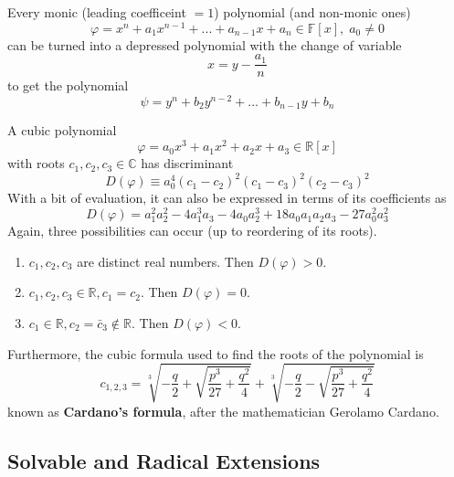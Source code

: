   \begin{theorem}
    Every monic (leading coefficeint $=1$) polynomial (and non-monic ones) 
    \begin{equation}
      \varphi = x^n + a_1 x^{n-1} + ... + a_{n-1} x + a_n \in \mathbb{F}[x], \; a_0 \neq 0
    \end{equation}
    can be turned into a depressed polynomial with the change of variable
    \begin{equation}
      x = y - \frac{a_1}{n}
    \end{equation}
    to get the polynomial 
    \begin{equation}
      \psi = y^n + b_2 y^{n-2} + ... + b_{n-1} y + b_n
    \end{equation}
  \end{theorem}

  \begin{lemma}
    A cubic polynomial 
    \begin{equation}
      \varphi = a_0 x^3 + a_1 x^2 + a_2 x + a_3 \in \mathbb{R}[x]
    \end{equation}
    with roots $c_1, c_2, c_3 \in \mathbb{C}$ has discriminant
    \begin{equation}
      D(\varphi) \equiv a_0^4 (c_1 - c_2)^2 (c_1 - c_3)^2 (c_2 - c_3)^2
    \end{equation}
    With a bit of evaluation, it can also be expressed in terms of its coefficients as
    \begin{equation}
      D(\varphi) = a_1^2 a_2^2 - 4a_1^3 a_3 - 4a_0 a_2^3 + 18 a_0 a_1 a_2 a_3 - 27 a_0^2 a_3^2
    \end{equation}
    Again, three possibilities can occur (up to reordering of its roots). 
    \begin{enumerate}
        \item $c_1, c_2, c_3$ are distinct real numbers. Then $D(\varphi) > 0$. 
        \item $c_1, c_2, c_3 \in \mathbb{R}, c_1 = c_2$. Then $D(\varphi) = 0$. 
        \item $c_1 \in \mathbb{R}, c_2 = \bar{c}_3 \not\in \mathbb{R}$. Then $D(\varphi) < 0$. 
    \end{enumerate}
    Furthermore, the cubic formula used to find the roots of the polynomial is 
    \begin{equation}
      c_{1, 2, 3} = \sqrt[3]{-\frac{q}{2} + \sqrt{\frac{p^3}{27} + \frac{q^2}{4}}} + \sqrt[3]{-\frac{q}{2} - \sqrt{\frac{p^3}{27} + \frac{q^2}{4}}}
    \end{equation}
    known as \textbf{Cardano's formula}, after the mathematician Gerolamo Cardano. 
  \end{lemma}

\subsection{Solvable and Radical Extensions}

